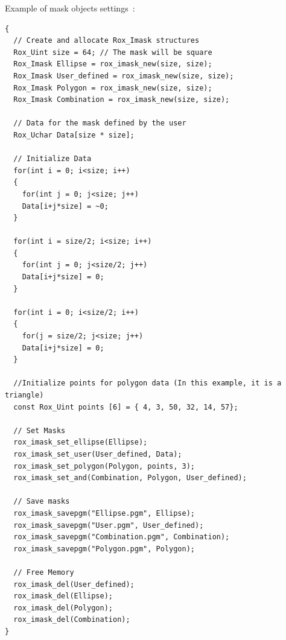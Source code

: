 \noindent Example of mask objects settings~:
\begin{lstlisting}
{
  // Create and allocate Rox_Imask structures
  Rox_Uint size = 64; // The mask will be square
  Rox_Imask Ellipse = rox_imask_new(size, size);
  Rox_Imask User_defined = rox_imask_new(size, size);
  Rox_Imask Polygon = rox_imask_new(size, size);
  Rox_Imask Combination = rox_imask_new(size, size);
 
  // Data for the mask defined by the user
  Rox_Uchar Data[size * size];

  // Initialize Data
  for(int i = 0; i<size; i++)
  {
    for(int j = 0; j<size; j++)
	Data[i+j*size] = ~0;
  }

  for(int i = size/2; i<size; i++)
  {
    for(int j = 0; j<size/2; j++)
	Data[i+j*size] = 0;
  }

  for(int i = 0; i<size/2; i++)
  {
    for(j = size/2; j<size; j++)
	Data[i+j*size] = 0;
  }
   
  //Initialize points for polygon data (In this example, it is a triangle)
  const Rox_Uint points [6] = { 4, 3, 50, 32, 14, 57}; 

  // Set Masks
  rox_imask_set_ellipse(Ellipse);
  rox_imask_set_user(User_defined, Data);
  rox_imask_set_polygon(Polygon, points, 3);
  rox_imask_set_and(Combination, Polygon, User_defined);

  // Save masks
  rox_imask_savepgm("Ellipse.pgm", Ellipse);
  rox_imask_savepgm("User.pgm", User_defined);  
  rox_imask_savepgm("Combination.pgm", Combination);
  rox_imask_savepgm("Polygon.pgm", Polygon);

  // Free Memory
  rox_imask_del(User_defined);
  rox_imask_del(Ellipse);
  rox_imask_del(Polygon);
  rox_imask_del(Combination);
}
\end{lstlisting}

